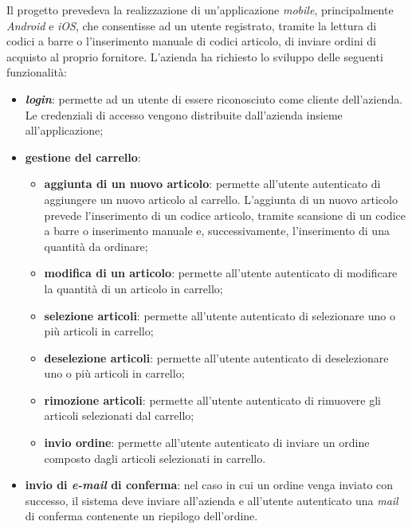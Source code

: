 Il progetto prevedeva la realizzazione di un'applicazione \textit{mobile}, principalmente \textit{Android} e \textit{iOS}, che consentisse ad un utente registrato, tramite la lettura di codici a barre o l'inserimento manuale di codici articolo, di inviare ordini di acquisto al proprio fornitore. L'azienda ha richiesto lo sviluppo delle seguenti funzionalità:
\begin{itemize}
	\item \textbf{\textit{login}}: permette ad un utente di essere riconosciuto come cliente dell'azienda. Le credenziali di accesso vengono distribuite dall'azienda insieme all'applicazione;
	\item \textbf{gestione del carrello}:
	\begin{itemize}
		\item \textbf{aggiunta di un nuovo articolo}: permette all'utente autenticato di aggiungere un nuovo articolo al carrello. L'aggiunta di un nuovo articolo prevede l'inserimento di un codice articolo, tramite scansione di un codice a barre o inserimento manuale e, successivamente, l'inserimento di una quantità da ordinare;
		\item \textbf{modifica di un articolo}: permette all'utente autenticato di modificare la quantità di un articolo in carrello;
		\item \textbf{selezione articoli}: permette all'utente autenticato di selezionare uno o più articoli in carrello;
		\item \textbf{deselezione articoli}: permette all'utente autenticato di deselezionare uno o più articoli in carrello;
		\item \textbf{rimozione articoli}: permette all'utente autenticato di rimuovere gli articoli selezionati dal carrello;
		\item \textbf{invio ordine}: permette all'utente autenticato di inviare un ordine composto dagli articoli selezionati in carrello.
	\end{itemize}
	\item \textbf{invio di \textit{e-mail} di conferma}: nel caso in cui un ordine venga inviato con successo, il sistema deve inviare all'azienda e all'utente autenticato una \textit{mail} di conferma contenente un riepilogo dell'ordine.
\end{itemize}

